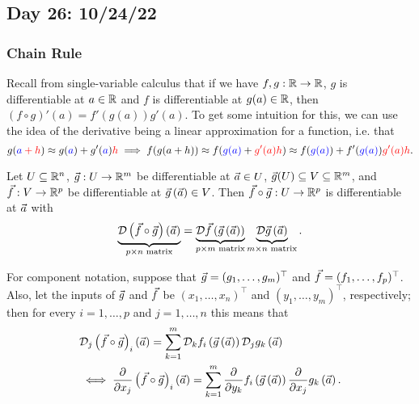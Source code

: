 \documentclass[main.tex]{subfiles}
\begin{document}
\subsection{Day 26: 10/24/22}
\subsubsection{Chain Rule}

Recall from single-variable calculus that if we have $f, g : \mathbb R \to \mathbb R$, $g$ is differentiable at $a\in \mathbb R$ and $f$ is differentiable at $g(a)\in \mathbb R$, then $(f\circ g)'(a) = f'(g(a))g'(a)$. To get some intuition for this, we can use the idea of the derivative being a linear approximation for a function, i.e. that 
\[g(\begingroup\color{blue}a\endgroup \begingroup\color{red}+ h\endgroup) \approx g(\begingroup\color{blue}a\endgroup) + g'(\begingroup\color{blue}a\endgroup)\begingroup\color{red}h\endgroup\implies f(g(a + h)) \approx f(\begingroup\color{blue}g(a)\endgroup + \begingroup\color{red}g'(a)h\endgroup) \approx f(\begingroup\color{blue}g(a)\endgroup) + f'(\begingroup\color{blue}g(a)\endgroup)\begingroup\color{red}g'(a)h\endgroup.\]

\begin{theorem}
    Let $U\subseteq \mathbb R^n$, $\vec{g} : U\to \mathbb R^m$ be differentiable at $\vec{a}\in U$, $\vec{g}(U)\subseteq V\subseteq \mathbb R^m$, and $\vec{f} : V \to \mathbb R^p$ be differentiable at $\vec{g}\left( \vec{a} \right)\in V$. Then $\vec{f}\circ \vec{g} : U\to \mathbb R^p$ is differentiable at $\vec{a}$ with
    \[\underbrace{\mathcal{D}\left( \vec{f}\circ \vec{g} \right)\left( \vec{a} \right)}_{p\times n\text{ matrix}} = \underbrace{\mathcal{D}\vec{f}\left( \vec{g}\left( \vec{a} \right) \right)}_{p\times m\text{ matrix}}\underbrace{\mathcal{D}\vec{g}\left( \vec{a} \right)}_{m\times n\text{ matrix}}.\]
\end{theorem}

For component notation, suppose that $\vec{g} = (g_1, \ldots , g_m)^\top$ and $\vec{f} = (f_1, \ldots , f_p)^\top$. Also, let the inputs of $\vec{g}$ and $\vec{f}$ be $(x_1, \ldots , x_n)^\top$ and $(y_1, \ldots , y_m)^\top$, respectively; then for every $i = 1, \ldots , p$ and $j = 1, \ldots , n$ this means that
\begin{align*}
    &\mathcal{D}_j\left( \vec{f}\circ \vec{g} \right)_i\left( \vec{a} \right) = \sum_{k = 1}^m \mathcal{D}_k f_i\left( \vec{g}\left( \vec{a} \right) \right)\mathcal{D}_j g_k\left( \vec{a} \right) \\
    &\iff \pdv{}{x_j}\left( \vec{f}\circ \vec{g} \right)_i\left( \vec{a} \right) = \sum_{k = 1}^m \pdv{}{y_k}f_i\left( \vec{g}\left( \vec{a} \right) \right)\pdv{}{x_j}g_k\left( \vec{a} \right).
\end{align*}
\end{document}
